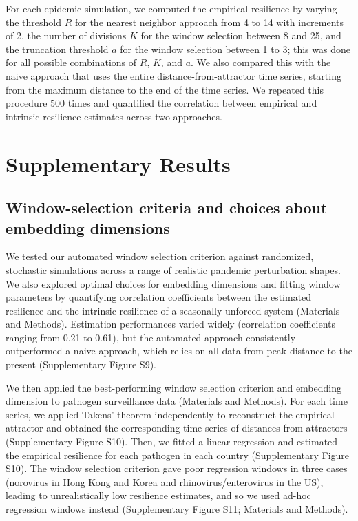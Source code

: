 \documentclass[12pt]{article}
\begin{document}
For each epidemic simulation, we computed the empirical resilience by varying the threshold $R$ for the nearest neighbor approach from 4 to 14 with increments of 2, the number of divisions $K$ for the window selection between 8 and 25, and the truncation threshold $a$ for the window selection between 1 to 3;
this was done for all possible combinations of $R$, $K$, and $a$.
We also compared this with the naive approach that uses the entire distance-from-attractor time series, starting from the maximum distance to the end of the time series.
We repeated this procedure 500 times and quantified the correlation between empirical and intrinsic resilience estimates across two approaches.

\pagebreak

\section*{Supplementary Results}

\subsection*{Window-selection criteria and choices about embedding dimensions}

We tested our automated window selection criterion against randomized, stochastic simulations across a range of realistic pandemic perturbation shapes.
We also explored optimal choices for embedding dimensions and fitting window parameters by quantifying correlation coefficients between the estimated resilience and the intrinsic resilience of a seasonally unforced system (Materials and Methods).
Estimation performances varied widely (correlation coefficients ranging from 0.21 to 0.61), but the automated approach consistently outperformed a naive approach, which relies on all data from peak distance to the present (Supplementary Figure S9).

We then applied the best-performing window selection criterion and embedding dimension to pathogen surveillance data (Materials and Methods).
For each time series, we applied Takens' theorem independently to reconstruct the empirical attractor and obtained the corresponding time series of distances from attractors (Supplementary Figure S10).
Then, we fitted a linear regression and estimated the empirical resilience for each pathogen in each country (Supplementary Figure S10).
The window selection criterion gave poor regression windows in three cases (norovirus in Hong Kong and Korea and rhinovirus/enterovirus in the US), leading to unrealistically low resilience estimates, and so we used ad-hoc regression windows instead (Supplementary Figure S11; Materials and Methods).
\end{document}
